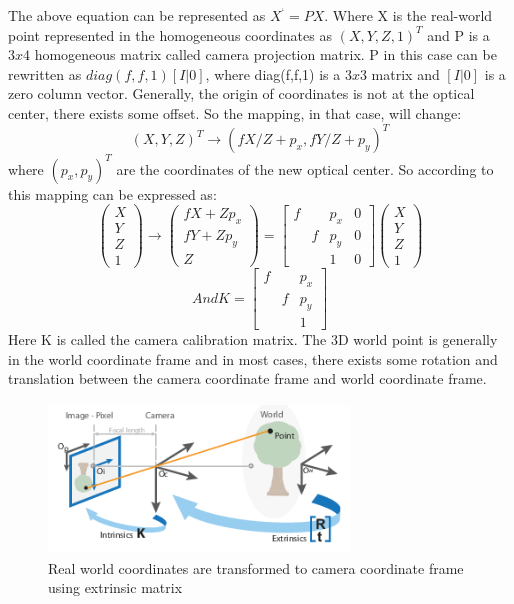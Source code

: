     
The above equation can be represented as  $X^{‘} = PX $. Where X is the real-world point represented in the homogeneous coordinates as $(X, Y, Z, 1)^{T}$ and P is a $3x4$ homogeneous matrix called camera projection matrix. P in this case can be rewritten as $diag(f,f,1) [I|0]$, where diag(f,f,1) is a $3x3$ matrix and $[I|0]$ is a zero column vector. 
Generally, the origin of coordinates is not at the optical center, there exists some offset. So the mapping, in that case, will change: 
\begin{equation}
(X,Y,Z)^{T} \rightarrow (fX/Z + p_{x}, fY/Z + p_{y})^{T}
\end{equation}
 where $(p_{x}, p_{y})^{T}$ are the coordinates of the new optical center. So according to this mapping can be expressed as:
   \begin{equation}
\left(\begin{array}{c}X \\ Y \\ Z \\ 1 \end{array}\right) \rightarrow \left(\begin{array}{c} fX + Zp_{x} \\ fY + Zp_{y} \\ Z \end{array}\right) = \begin{bmatrix}f & &p_{x} & 0 \\  &f &p_{y} & 0  \\   & &1 & 0   \end{bmatrix}\left(\begin{array}{c}X\\ Y  \\Z \\ 1 \end{array}\right)
\end{equation}
\begin{equation}
And  K =  \begin{bmatrix}f & &p_{x} \\  &f &p_{y}  \\   & &1    \end{bmatrix}
\end{equation}
 Here K is called the camera calibration matrix. The 3D world point is generally in the world coordinate frame and in most cases, there exists some rotation and translation between the camera coordinate frame and world coordinate frame.
 
    \begin{figure}[h]
    \centering
    \includegraphics[width=8cm, height =4cm]{images/camera_geo.png}
    \caption{ Real world coordinates are transformed to camera coordinate frame using extrinsic matrix \cite{10.5555/861369}}
    \end{figure}
    
